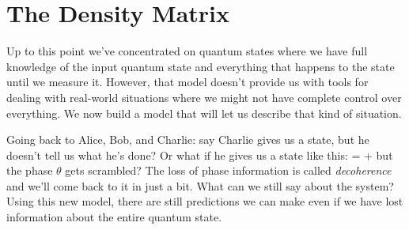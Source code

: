 \chapter{The Density Matrix}
Up to this point we've concentrated on quantum states where we have full knowledge of the input quantum state and everything that happens to the state until we measure it. However, that model doesn't provide us with tools for dealing with real-world situations where we might not have complete control over everything. We now build a model that will let us describe that kind of situation.

Going back to Alice, Bob, and Charlie: say Charlie gives us a state, but he doesn't tell us what he's done? Or what if he gives us a state like this:
\beq
\ket{\Psi} = \alpha{} + \beta\E{\I\theta}
\eeq
but the phase $\theta$ gets scrambled? The loss of phase information is called {\em decoherence} and we'll come back to it in just a bit.  What can we still say about the system? Using this new model, there are still predictions we can make even if we have lost information about the entire quantum state.

